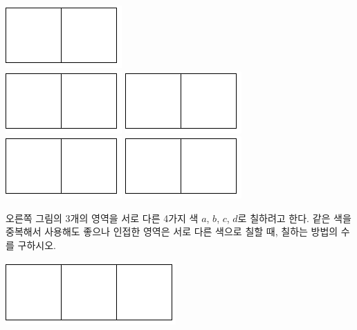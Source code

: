 \documentclass[a4paper]{oblivoir}
\begin{document}
\includegraphics[width=.2\textwidth]{1}\\[5pt]
\includegraphics[width=.2\textwidth]{1}\quad
\includegraphics[width=.2\textwidth]{1}\quad
\includegraphics[width=.2\textwidth]{1}\quad
\includegraphics[width=.2\textwidth]{1}


\noindent
%
\begin{minipage}{.65\textwidth}
\begin{Exercise}
오른쪽 그림의 3개의 영역을 서로 다른 4가지 색 \(a\), \(b\), \(c\), \(d\)로 칠하려고 한다.
같은 색을 중복해서 사용해도 좋으나 인접한 영역은 서로 다른 색으로 칠할 때, 칠하는 방법의 수를 구하시오.
\end{Exercise}
\end{minipage}
\quad
\begin{minipage}{.25\textwidth}
\includegraphics[width=.5\textwidth]{2}
\end{minipage}
\end{document}
